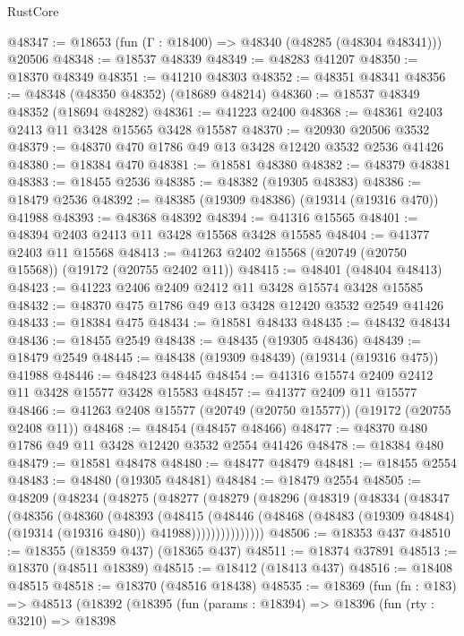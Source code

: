 \begin{lexlean}{RustCore}
\begin{coremodule}
@48347 := @18653 (fun (Γ : @18400) => @48340 (@48285 (@48304 @48341))) @20506
@48348 := @18537 @48339
@48349 := @48283 @41207
@48350 := @18370 @48349
@48351 := @41210 @48303
@48352 := @48351 @48341
@48356 := @48348 (@48350 @48352) (@18689 @48214)
@48360 := @18537 @48349 @48352 (@18694 @48282)
@48361 := @41223 @2400
@48368 := @48361 @2403 @2413 @11 @3428 @15565 @3428 @15587
@48370 := @20930 @20506 @3532
@48379 := @48370 @470 @1786 @49 @13 @3428 @12420 @3532 @2536 @41426
@48380 := @18384 @470
@48381 := @18581 @48380
@48382 := @48379 @48381
@48383 := @18455 @2536
@48385 := @48382 (@19305 @48383)
@48386 := @18479 @2536
@48392 := @48385 (@19309 @48386) (@19314 (@19316 @470)) @41988
@48393 := @48368 @48392
@48394 := @41316 @15565
@48401 := @48394 @2403 @2413 @11 @3428 @15568 @3428 @15585
@48404 := @41377 @2403 @11 @15568
@48413 := @41263 @2402 @15568 (@20749 (@20750 @15568)) (@19172 (@20755 @2402 @11))
@48415 := @48401 (@48404 @48413)
@48423 := @41223 @2406 @2409 @2412 @11 @3428 @15574 @3428 @15585
@48432 := @48370 @475 @1786 @49 @13 @3428 @12420 @3532 @2549 @41426
@48433 := @18384 @475
@48434 := @18581 @48433
@48435 := @48432 @48434
@48436 := @18455 @2549
@48438 := @48435 (@19305 @48436)
@48439 := @18479 @2549
@48445 := @48438 (@19309 @48439) (@19314 (@19316 @475)) @41988
@48446 := @48423 @48445
@48454 := @41316 @15574 @2409 @2412 @11 @3428 @15577 @3428 @15583
@48457 := @41377 @2409 @11 @15577
@48466 := @41263 @2408 @15577 (@20749 (@20750 @15577)) (@19172 (@20755 @2408 @11))
@48468 := @48454 (@48457 @48466)
@48477 := @48370 @480 @1786 @49 @11 @3428 @12420 @3532 @2554 @41426
@48478 := @18384 @480
@48479 := @18581 @48478
@48480 := @48477 @48479
@48481 := @18455 @2554
@48483 := @48480 (@19305 @48481)
@48484 := @18479 @2554
@48505 := @48209
    (@48234
      (@48275
        (@48277
          (@48279
            (@48296
              (@48319
                (@48334
                  (@48347
                    (@48356
                      (@48360
                        (@48393
                          (@48415
                            (@48446
                              (@48468
                                (@48483 (@19309 @48484) (@19314 (@19316 @480)) @41988)))))))))))))))
@48506 := @18353 @437
@48510 := @18355 (@18359 @437) (@18365 @437)
@48511 := @18374 @37891
@48513 := @18370 (@48511 @18389)
@48515 := @18412 (@18413 @437)
@48516 := @18408 @48515
@48518 := @18370 (@48516 @18438)
@48535 := @18369
    (fun (fn : @183) =>
    @48513
      (@18392
        (@18395
          (fun (params : @18394) =>
          @18396
            (fun (rty : @3210) =>
            @18398

\end{coremodule}
\end{lexlean}

